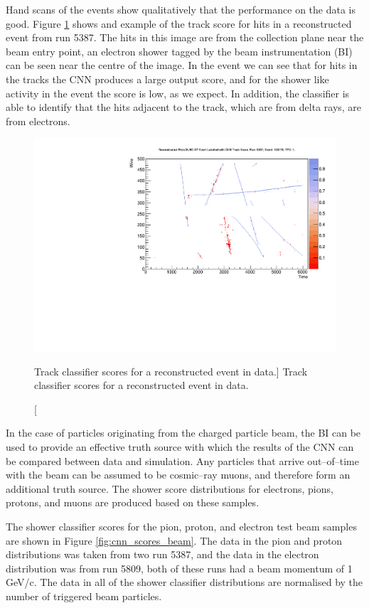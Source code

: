 Hand scans of the events show qualitatively that the performance on the data is
good. Figure \ref{fig:real_event} shows and example of the track score for hits
in a reconstructed event from run 5387. The hits in this image are from the
collection plane near the beam entry point, an electron shower tagged by the
beam instrumentation (BI) can be seen near the centre of the image. In the event
we can see that for hits in the tracks the CNN produces a large output score,
and for the shower like activity in the event the score is low, as we expect. In
addition, the classifier is able to identify that the hits adjacent to the 
track, which are from delta rays, are from electrons.

\begin{figure}
	\centering
	\includegraphics[width=\textwidth]{figures/run5387_tpc1_view2_128178.pdf}
	\caption
	[Track classifier scores for a reconstructed event in \protodune{} data.]
	{Track classifier scores for a reconstructed event in \protodune{} data.}
	\label{fig:real_event}
\end{figure}

In the case of particles originating from the charged particle beam, the BI can
be used to provide an effective truth source with which the results of the CNN 
can be compared between data and simulation. Any particles that arrive
out--of--time with the beam can be assumed to be cosmic--ray muons, and 
therefore form an additional truth source. The shower score distributions for
electrons, pions, protons, and muons are produced based on these samples.

The shower classifier scores for the pion, proton, and electron test beam 
samples are shown in Figure \ref{fig:cnn_scores_beam}. The data in the pion 
and proton distributions was taken from two \protodune{} run 5387, and the 
data in the electron distribution was from run 5809, both of these runs had a 
beam momentum of 1 GeV/c. The data in all of the shower classifier distributions
are normalised by the number of triggered beam particles.

